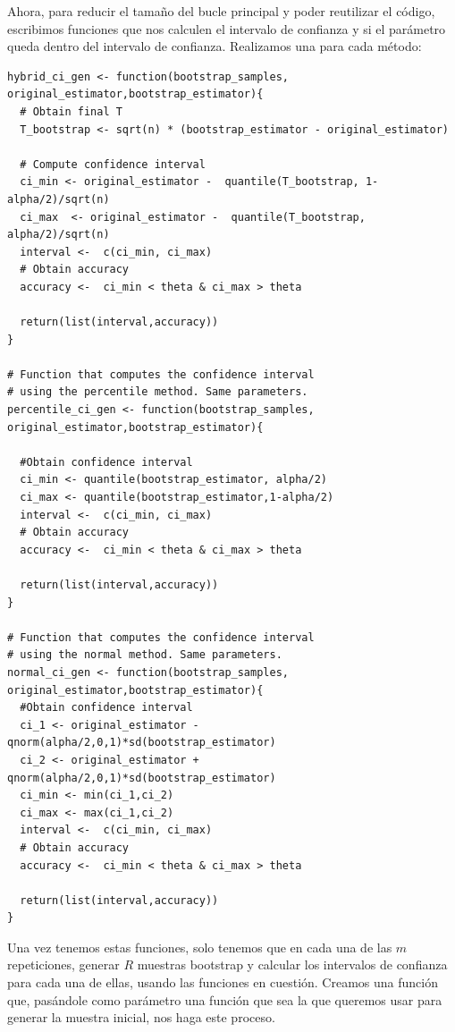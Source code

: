 \documentclass[a4paper]{article}
\begin{document}
   Ahora, para reducir el tamaño del bucle principal y poder reutilizar el código, escribimos funciones que nos calculen el intervalo de confianza y si el parámetro queda dentro del intervalo de confianza. Realizamos una para cada método:
   \begin{verbatim}
hybrid_ci_gen <- function(bootstrap_samples, original_estimator,bootstrap_estimator){
  # Obtain final T
  T_bootstrap <- sqrt(n) * (bootstrap_estimator - original_estimator)

  # Compute confidence interval
  ci_min <- original_estimator -  quantile(T_bootstrap, 1-alpha/2)/sqrt(n)
  ci_max  <- original_estimator -  quantile(T_bootstrap, alpha/2)/sqrt(n)
  interval <-  c(ci_min, ci_max)
  # Obtain accuracy
  accuracy <-  ci_min < theta & ci_max > theta

  return(list(interval,accuracy))
}

# Function that computes the confidence interval
# using the percentile method. Same parameters.
percentile_ci_gen <- function(bootstrap_samples, original_estimator,bootstrap_estimator){

  #Obtain confidence interval
  ci_min <- quantile(bootstrap_estimator, alpha/2)
  ci_max <- quantile(bootstrap_estimator,1-alpha/2)
  interval <-  c(ci_min, ci_max)
  # Obtain accuracy
  accuracy <-  ci_min < theta & ci_max > theta

  return(list(interval,accuracy))
}

# Function that computes the confidence interval
# using the normal method. Same parameters.
normal_ci_gen <- function(bootstrap_samples, original_estimator,bootstrap_estimator){
  #Obtain confidence interval
  ci_1 <- original_estimator - qnorm(alpha/2,0,1)*sd(bootstrap_estimator)
  ci_2 <- original_estimator + qnorm(alpha/2,0,1)*sd(bootstrap_estimator)
  ci_min <- min(ci_1,ci_2)
  ci_max <- max(ci_1,ci_2)
  interval <-  c(ci_min, ci_max)
  # Obtain accuracy
  accuracy <-  ci_min < theta & ci_max > theta

  return(list(interval,accuracy))
}
     \end{verbatim}


   Una vez tenemos estas funciones, solo tenemos que en cada una de las \(m\) repeticiones, generar \(R\) muestras bootstrap y calcular los intervalos de confianza para cada una de ellas, usando las funciones en cuestión. Creamos una función que, pasándole como parámetro una función que sea la que queremos usar para generar la muestra inicial, nos haga este proceso.
\end{document}
